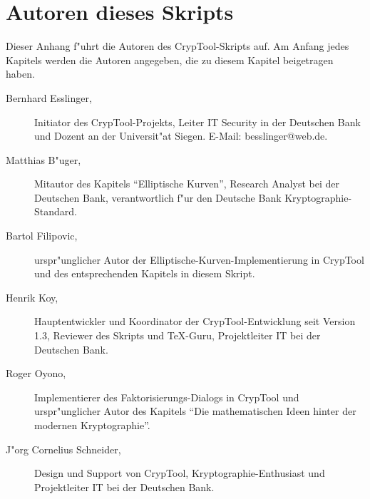 \section{Autoren dieses Skripts}
\hypertarget{appendix-authors}{}\label{s:appendix-authors}

Dieser Anhang f"uhrt die Autoren des CrypTool-Skripts auf. Am Anfang jedes
Kapitels werden die Autoren angegeben, die zu diesem Kapitel beigetragen haben.

\begin{description}
\item[Bernhard Esslinger,] Initiator des CrypTool-Projekts, Leiter IT Security
in der Deutschen Bank und Dozent an der Universit"at Siegen. E-Mail:
besslinger@web.de.
 
\item[Matthias B"uger,] Mitautor des Kapitels ``Elliptische Kurven'', Research
Analyst bei der Deutschen Bank, verantwortlich f"ur den Deutsche Bank
Kryptographie-Standard.

\item[Bartol Filipovic,] urspr"unglicher Autor der
Elliptische-Kurven-Implementierung in CrypTool und des entsprechenden Kapitels
in diesem Skript.

\item[Henrik Koy, ] Hauptentwickler und Koordinator der CrypTool-Entwicklung
seit Version 1.3, Reviewer des Skripts und \TeX{}-Guru, Projektleiter IT bei der
Deutschen Bank.

\item[Roger Oyono, ] Implementierer des Faktorisierungs-Dialogs in CrypTool und urspr"unglicher Autor des Kapitels "`Die mathematischen Ideen hinter der modernen Kryptographie"'.

\item[J"org Cornelius Schneider,] Design und Support von CrypTool,
Kryptographie-Enthusiast und Projektleiter IT bei der Deutschen Bank.

\end{description}

